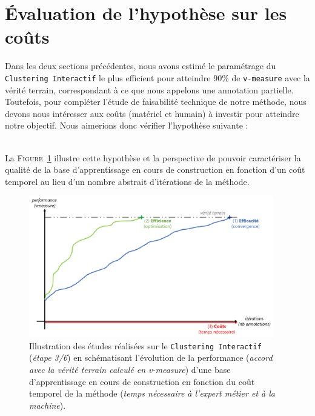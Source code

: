 \section{Évaluation de l'hypothèse sur les coûts}
\label{section:4.3-HYPOTHESE-COUTS}

	Dans les deux sections précédentes, nous avons estimé le paramétrage du \texttt{Clustering Interactif} le plus efficient pour atteindre $90$\% de \texttt{v-measure} avec la vérité terrain, correspondant à ce que nous appelons une annotation partielle.
	Toutefois, pour compléter l'étude de faisabilité technique de notre méthode, nous devons nous intéresser aux coûts (matériel et humain) à investir pour atteindre notre objectif.
	Nous aimerions donc vérifier l'hypothèse suivante :
	
	\begin{tcolorbox}[
		title=\faVial~\textbf{Hypothèse sur les coûts}~\faVial,
		colback=colorTcolorboxHypothesis!15,
		colframe=colorTcolorboxHypothesis!75,
		width=\linewidth
	]
		 \\
		
		La \textsc{Figure~\ref{figure:4.3-HYPOTHESE-COUTS}} illustre cette hypothèse et la perspective de pouvoir caractériser la qualité de la base d'apprentissage en cours de construction en fonction d'un coût temporel au lieu d'un nombre abstrait d'itérations de la méthode. 
		\begin{figure}[H]  %
			\centering
			\includegraphics[width=0.95\textwidth]{figures/hypotheses-03-couts}
			\caption{
				Illustration des études réalisées sur le \texttt{Clustering Interactif} (\textit{étape 3/6}) en schématisant l'évolution de la performance (\textit{accord avec la vérité terrain calculé en v-measure}) d'une base d'apprentissage en cours de construction en fonction du coût temporel de la méthode (\textit{temps nécessaire à l'expert métier et à la machine}).
			}
			\label{figure:4.3-HYPOTHESE-COUTS}
		\end{figure}
	\end{tcolorbox}

